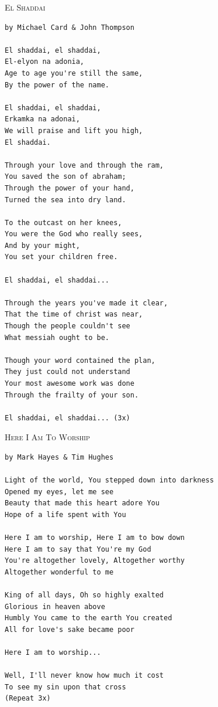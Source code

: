 \documentclass[10pt,oneside,footinclude=true,headinclude=true]{scrbook} %
\newcommand\songtitle[1]{
	\hspace*{-3.7mm}\Large\textsc{#1}
}
\begin{document}
\bigskip
\medskip
\songtitle{El Shaddai}
\begin{verbatim}
by Michael Card & John Thompson

El shaddai, el shaddai,
El-elyon na adonia,
Age to age you're still the same,
By the power of the name.

El shaddai, el shaddai,
Erkamka na adonai,
We will praise and lift you high,
El shaddai.

Through your love and through the ram,
You saved the son of abraham;
Through the power of your hand,
Turned the sea into dry land.

To the outcast on her knees,
You were the God who really sees,
And by your might,
You set your children free.

El shaddai, el shaddai...

Through the years you've made it clear,
That the time of christ was near,
Though the people couldn't see
What messiah ought to be.

Though your word contained the plan,
They just could not understand
Your most awesome work was done
Through the frailty of your son.

El shaddai, el shaddai... (3x)
\end{verbatim}


\bigskip
\medskip
\songtitle{Here I Am To Worship}
\begin{verbatim}
by Mark Hayes & Tim Hughes

Light of the world, You stepped down into darkness
Opened my eyes, let me see
Beauty that made this heart adore You
Hope of a life spent with You

Here I am to worship, Here I am to bow down
Here I am to say that You're my God
You're altogether lovely, Altogether worthy
Altogether wonderful to me

King of all days, Oh so highly exalted
Glorious in heaven above
Humbly You came to the earth You created
All for love's sake became poor

Here I am to worship...

Well, I'll never know how much it cost
To see my sin upon that cross
(Repeat 3x)
\end{verbatim}

\end{document}

